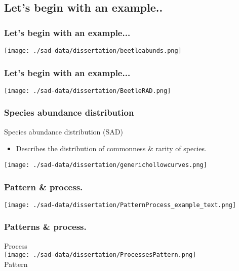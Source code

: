 \documentclass[14pt]{beamer}
\begin{document}
\subsection{Let's begin with an example..}
\begin{frame}
\frametitle{Let's begin with an example...}
\begin{center}
\texttt{[image: ./sad-data/dissertation/beetleabunds.png]}\\
\end{center}
\end{frame}

\begin{frame}
\frametitle{Let's begin with an example...}
\begin{center}
\texttt{[image: ./sad-data/dissertation/BeetleRAD.png]}\\
\end{center}
\end{frame}

\begin{frame}
\frametitle{Species abundance distribution}
Species abundance distribution (SAD)
\begin{itemize}
\item Describes the distribution of commonness \& rarity of species.
\end{itemize}
\begin{center}
\texttt{[image: ./sad-data/dissertation/generichollowcurves.png]}\\
\end{center}
\end{frame}

\begin{frame}
\frametitle{Pattern \& process.}
\begin{center}
\texttt{[image: ./sad-data/dissertation/PatternProcess\_example\_text.png]}\\
\end{center}
\end{frame}

\begin{frame}
\frametitle{Patterns \& process.}
\begin{huge}
\begin{center}
Process\\ 
\texttt{[image: ./sad-data/dissertation/ProcessesPattern.png]}\\
Pattern\\
\end{center}
\end{huge}
\end{frame}
\end{document}
